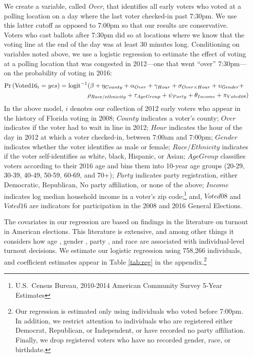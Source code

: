 \documentclass[12pt,titlepage]{article}
\begin{document}
We create a variable, called \emph{Over}, that identifies all early
voters who voted at a polling location on a day where the last voter
checked-in past 7:30pm. We use this latter cutoff as opposed to 7:00pm
so that our results are conservative. Voters who cast ballots after
7:30pm did so at locations where we know that the voting line at the
end of the day was at least 30 minutes long. Conditioning on variables
noted above, we use a logistic regression to estimate the effect of
voting at a polling location that was congested in 2012---one that
went ``over'' 7:30pm---on the probability of voting in 2016:
\begin{equation*}
  \begin{aligned}
    \textup{Pr}\left(\mathrm{Voted16}_{i} = yes\right) =
    \textup{logit}^{-1}&(\beta + \eta_{County} + \alpha_{Over} + \gamma_{Hour} +
    \sigma_{Over \times Hour} + \upsilon_{Gender}  + \\& \rho_{Race/ethnicity} +
      \tau_{Age Group} + \psi_{Party} + \theta_{Income} + \pi_{Voted\emph{08}})
  \end{aligned}  
\end{equation*}
%
In the above model, $i$ denotes our collection of 2012 early voters
who appear in the history of Florida voting in 2008; $County$
indicates a voter's county; $Over$ indicates if the voter had to wait
in line in 2012; $Hour$ indicates the hour of the day in 2012 at which
a voter checked-in, between 7:00am and 7:00pm; $Gender$ indicates
whether the voter identifies as male or female; $Race/Ethnicity$
indicates if the voter self-identifies as white, black, Hispanic, or
Asian; $Age Group$ classifies voters according to their 2016 age and
bins them into 10-year age groups (20-29, 30-39, 40-49, 50-59, 60-69,
and 70+); $Party$ indicates party registration, either Democratic,
Republican, No party affiliation, or none of the above; $Income$
indicates log median household income in a voter's zip
code;\footnote{U.S.\ Census Bureau, 2010-2014 American Community
  Survey 5-Year Estimates} and, $Voted08$ and $Voted16$ are indicators
for participation in the 2008 and 2016 General Elections.

The covariates in our regression are based on findings in the
literature on turnout in American elections.  This literature is
extensive, and among other things it considers how age
\citep{strateetal:age,hightonwolfinger:lifecycle}, gender
\citep{schlozman:genderdifferentvoice}, party
\citep{martinezgill:partisanturnout,grofmanetal:turnout}, and race
\citep{verbaetal:raceparticipation,fraga:raceturnout} are associated
with individual-level turnout decisions.  We estimate our logistic
regression using 758,266 individuals, and coefficient estimates appear
in Table \ref{tab:reg} in the appendix.\footnote{Our regression is
  estimated only using individuals who voted before 7:00pm.  In
  addition, we restrict attention to individuals who are registered
  either Democrat, Republican, or Independent, or have recorded no
  party affiliation.  Finally, we drop registered voters who have no
  recorded gender, race, or birthdate.}
\end{document}
